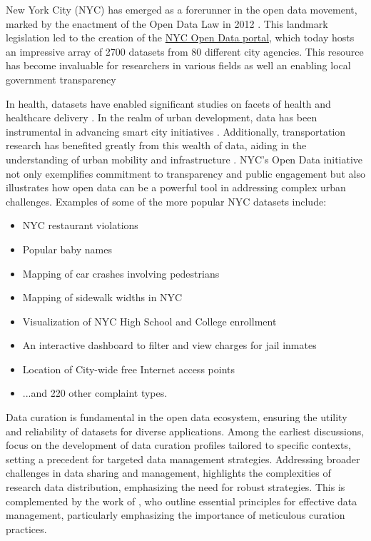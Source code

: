 \documentclass[12pt, titlepage]{article}
\begin{document}
New York City (NYC) has emerged as a forerunner in the open data
movement, marked by the enactment of the Open Data Law in 2012
\citep{zuiderwijk2014open}. This landmark legislation led to the
creation of the \href{https://opendata.cityofnewyork.us}{NYC Open Data
  portal}, which today hosts an impressive array of 2700 datasets
from 80 different city agencies. This resource has become invaluable
for researchers in various fields as well an enabling local government transparency

In health, datasets have enabled
significant studies on facets of health and healthcare delivery
\citep{cantor2018facets, shankar2021data}. In the realm of urban
development, data has been instrumental in advancing smart city
initiatives \citep{neves2020impacts}. Additionally, transportation
research has benefited greatly from this wealth of data, aiding in the
understanding of urban mobility and infrastructure
\citep{gerte2019understanding}. NYC's Open Data initiative not only
exemplifies commitment to transparency and public engagement but also
illustrates how open data can be a powerful tool in addressing complex
urban challenges. Examples of some of the more popular NYC datasets include:

\begin{itemize}
	\item NYC restaurant violations
	\item Popular baby names
	\item Mapping of car crashes involving pedestrians
	\item Mapping of sidewalk widths in NYC 
	\item Visualization of NYC High School and College enrollment
	\item An interactive dashboard to filter and view charges for jail inmates
	\item Location of City-wide free Internet access points
	\item ...and 220 other complaint types. 
\end{itemize}

Data curation is fundamental in the open data ecosystem, ensuring the
utility and reliability of datasets for diverse applications. Among
the earliest discussions, \citet{witt2009constructing} focus on the
development of data curation profiles tailored to specific contexts,
setting a precedent for targeted data management
strategies. Addressing broader challenges in data sharing and
management, \citet{borgman2012conundrum} highlights the complexities
of research data distribution, emphasizing the need for robust
strategies. This is complemented by the work of \citet{hart2016ten},
who outline essential principles for effective data management,
particularly emphasizing the importance of meticulous curation
practices. 
\end{document}
